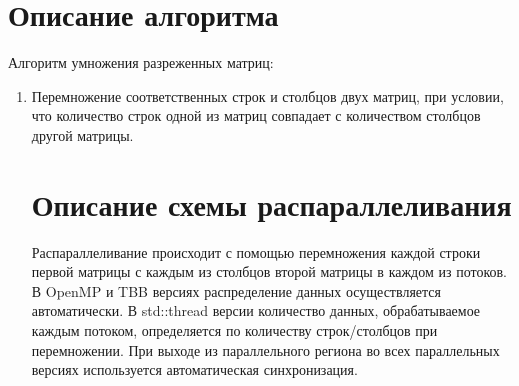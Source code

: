 \documentclass{report}
\begin{document}
\section*{Описание алгоритма}
\par Алгоритм умножения разреженных матриц:
\begin{enumerate}
\item Перемножение соответственных строк и столбцов двух матриц, при условии, что количество строк одной из матриц совпадает с количеством столбцов другой матрицы.
\newpage

\section*{Описание схемы распараллеливания}
\par Распараллеливание происходит с помощью перемножения каждой строки первой матрицы с каждым из столбцов второй матрицы в каждом из потоков. В OpenMP и TBB версиях распределение данных осуществляется автоматически. В std::thread версии количество данных, обрабатываемое каждым потоком, определяется по количеству строк/столбцов при перемножении. При выходе из параллельного региона во всех параллельных версиях используется автоматическая синхронизация.

\newpage


\end{enumerate}
\end{document}
